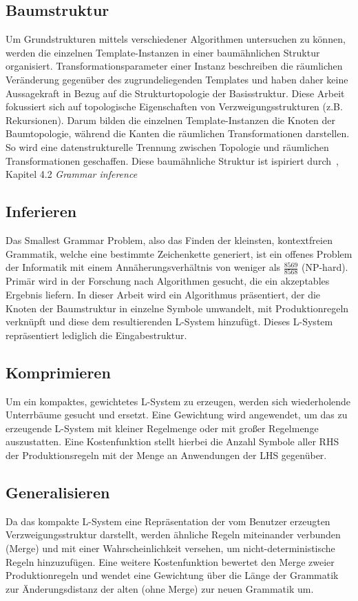 \subsection*{Baumstruktur}
Um Grundstrukturen mittels verschiedener Algorithmen untersuchen zu können, werden die einzelnen Template-Instanzen in
einer baumähnlichen Struktur organisiert.
Transformationsparameter einer Instanz beschreiben die räumlichen Veränderung gegenüber des zugrundeliegenden Templates
und haben daher keine Aussagekraft in Bezug auf die Strukturtopologie der Basisstruktur.
Diese Arbeit fokussiert sich auf topologische Eigenschaften von Verzweigungsstrukturen (z.B. Rekursionen).
Darum bilden die einzelnen Template-Instanzen die Knoten der Baumtopologie, während die Kanten die räumlichen Transformationen
darstellen.
So wird eine datenstrukturelle Trennung zwischen Topologie und räumlichen Transformationen geschaffen.
Diese baumähnliche Struktur ist ispiriert durch~\cite{guo_2020}, Kapitel 4.2 \textit{Grammar inference}

\subsection*{Inferieren}
Das Smallest Grammar Problem, also das Finden der kleinsten, kontextfreien Grammatik, welche eine bestimmte Zeichenkette
generiert, ist ein offenes Problem der Informatik mit einem Annäherungsverhältnis von weniger als $\frac{8569}{8568}$
(NP-hard).
Primär wird in der Forschung nach Algorithmen gesucht, die ein akzeptables Ergebnis liefern.
In dieser Arbeit wird ein Algorithmus präsentiert, der die Knoten der Baumstruktur in einzelne Symbole umwandelt, mit
Produktionregeln verknüpft und diese dem resultierenden L-System hinzufügt.
Dieses L-System repräsentiert lediglich die Eingabestruktur.

\subsection*{Komprimieren}
Um ein kompaktes, gewichtetes L-System zu erzeugen, werden sich wiederholende Unterrbäume gesucht und ersetzt.
Eine Gewichtung wird angewendet, um das zu erzeugende L-System mit kleiner Regelmenge oder mit
großer Regelmenge auszustatten.
Eine Kostenfunktion stellt hierbei die Anzahl Symbole aller RHS der Produktionsregeln mit der Menge an Anwendungen der
LHS gegenüber.

\subsection*{Generalisieren}
Da das kompakte L-System eine Repräsentation der vom Benutzer erzeugten Verzweigungsstruktur darstellt, werden ähnliche
Regeln miteinander verbunden (Merge) und mit einer Wahrscheinlichkeit versehen, um nicht-deterministische Regeln hinzuzufügen.
Eine weitere Kostenfunktion bewertet den Merge zweier Produktionregeln und wendet eine Gewichtung über die Länge der Grammatik
zur Änderungsdistanz der alten (ohne Merge) zur neuen Grammatik um.

